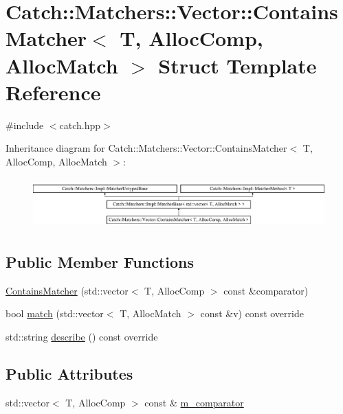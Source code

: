 \hypertarget{struct_catch_1_1_matchers_1_1_vector_1_1_contains_matcher}{}\section{Catch\+:\+:Matchers\+:\+:Vector\+:\+:Contains\+Matcher$<$ T, Alloc\+Comp, Alloc\+Match $>$ Struct Template Reference}
\label{struct_catch_1_1_matchers_1_1_vector_1_1_contains_matcher}


{\ttfamily \#include $<$catch.\+hpp$>$}

Inheritance diagram for Catch\+:\+:Matchers\+:\+:Vector\+:\+:Contains\+Matcher$<$ T, Alloc\+Comp, Alloc\+Match $>$\+:\begin{figure}[H]
\begin{center}
\leavevmode
\includegraphics[height=1.944444cm]{struct_catch_1_1_matchers_1_1_vector_1_1_contains_matcher}
\end{center}
\end{figure}
\subsection*{Public Member Functions}
\begin{DoxyCompactItemize}
\item 
\mbox{\hyperlink{struct_catch_1_1_matchers_1_1_vector_1_1_contains_matcher_a5cff10175edc91ed105b157493218ad8}{Contains\+Matcher}} (std\+::vector$<$ T, Alloc\+Comp $>$ const \&comparator)
\item 
bool \mbox{\hyperlink{struct_catch_1_1_matchers_1_1_vector_1_1_contains_matcher_a3104513b50a3da1659f82d69ac79057d}{match}} (std\+::vector$<$ T, Alloc\+Match $>$ const \&v) const override
\item 
std\+::string \mbox{\hyperlink{struct_catch_1_1_matchers_1_1_vector_1_1_contains_matcher_aa8ba33f6de86d0198b77023e1808933b}{describe}} () const override
\end{DoxyCompactItemize}
\subsection*{Public Attributes}
\begin{DoxyCompactItemize}
\item 
std\+::vector$<$ T, Alloc\+Comp $>$ const  \& \mbox{\hyperlink{struct_catch_1_1_matchers_1_1_vector_1_1_contains_matcher_a76f6a1d34cfe94e506fc44175fc2981d}{m\+\_\+comparator}}
\end{DoxyCompactItemize}
